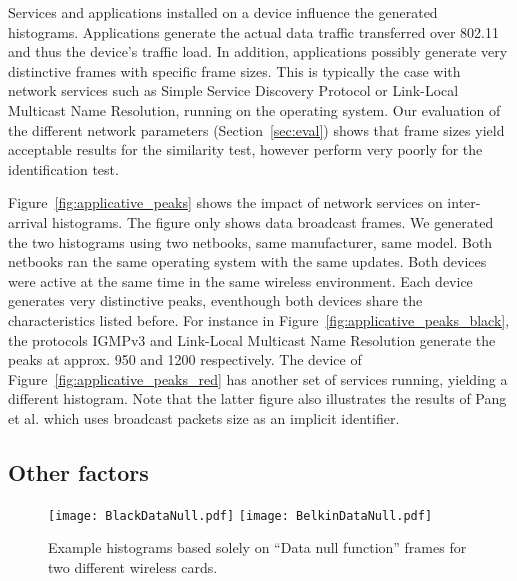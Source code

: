 \documentclass[10pt, conference, compsocconf, letterpaper]{IEEEtran}
\begin{document}
Services and applications installed on a device influence the generated histograms. 
Applications generate the actual data traffic transferred over 802.11 and thus the device's traffic load. 
In addition, applications possibly generate very distinctive frames with specific frame sizes.
This is typically the case with network services such as Simple Service Discovery Protocol or Link-Local Multicast Name Resolution, running on the operating system. 
Our evaluation of the different network parameters (Section~\ref{sec:eval}) shows that frame sizes yield acceptable results for the
similarity test, however perform very poorly for the identification test.

Figure~\ref{fig:applicative_peaks} shows the impact of network services on inter-arrival histograms.
The figure only shows data broadcast frames. We generated the two histograms using two netbooks, same manufacturer, same model. Both netbooks ran the same operating system with the same updates. Both devices were active at the same time in the same wireless environment.  
Each device generates very distinctive peaks, eventhough both devices share the characteristics listed before. 
For instance in Figure~\ref{fig:applicative_peaks_black}, the protocols IGMPv3 and Link-Local Multicast Name Resolution generate the peaks at approx. 950  and 1200  respectively.
The device of Figure~\ref{fig:applicative_peaks_red} has another set of services running, yielding a different histogram.
Note that the latter figure also illustrates the results of Pang et al. \cite{Pang:Mobicom} which uses broadcast packets size as an implicit identifier.






\subsection{Other factors}

\begin{figure}
\begin{center}
\texttt{[image: BlackDataNull.pdf]}
\texttt{[image: BelkinDataNull.pdf]}
\caption{Example histograms based solely on ``Data null function'' frames for two different wireless cards.}
\label{fig:histogrampowersavemode}
\end{center}
\end{figure}
\end{document}

